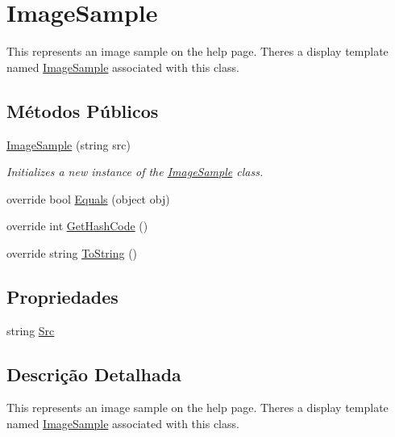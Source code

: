 \hypertarget{classApi3Layers_1_1Areas_1_1HelpPage_1_1ImageSample}{}\section{Image\+Sample}
\label{classApi3Layers_1_1Areas_1_1HelpPage_1_1ImageSample}


This represents an image sample on the help page. There\textquotesingle{}s a display template named \hyperlink{classApi3Layers_1_1Areas_1_1HelpPage_1_1ImageSample}{Image\+Sample} associated with this class.  


\subsection*{Métodos Públicos}
\begin{DoxyCompactItemize}
\item 
\hyperlink{classApi3Layers_1_1Areas_1_1HelpPage_1_1ImageSample_a6de2049a24dc276ace8856fa9a99289f}{Image\+Sample} (string src)
\begin{DoxyCompactList}\small\item\em Initializes a new instance of the \hyperlink{classApi3Layers_1_1Areas_1_1HelpPage_1_1ImageSample}{Image\+Sample} class. \end{DoxyCompactList}\item 
override bool \hyperlink{classApi3Layers_1_1Areas_1_1HelpPage_1_1ImageSample_aadf763f0213fc2f3875230b06bb0b6cf}{Equals} (object obj)
\item 
override int \hyperlink{classApi3Layers_1_1Areas_1_1HelpPage_1_1ImageSample_a77e1afa2b6dee1ed3640da81d7407b42}{Get\+Hash\+Code} ()
\item 
override string \hyperlink{classApi3Layers_1_1Areas_1_1HelpPage_1_1ImageSample_aa73e7c4dd1df5fd5fbf81c7764ee1533}{To\+String} ()
\end{DoxyCompactItemize}
\subsection*{Propriedades}
\begin{DoxyCompactItemize}
\item 
string \hyperlink{classApi3Layers_1_1Areas_1_1HelpPage_1_1ImageSample_a254a653c5ba3d8f839788a10397b7492}{Src}
\end{DoxyCompactItemize}


\subsection{Descrição Detalhada}
This represents an image sample on the help page. There\textquotesingle{}s a display template named \hyperlink{classApi3Layers_1_1Areas_1_1HelpPage_1_1ImageSample}{Image\+Sample} associated with this class. 



